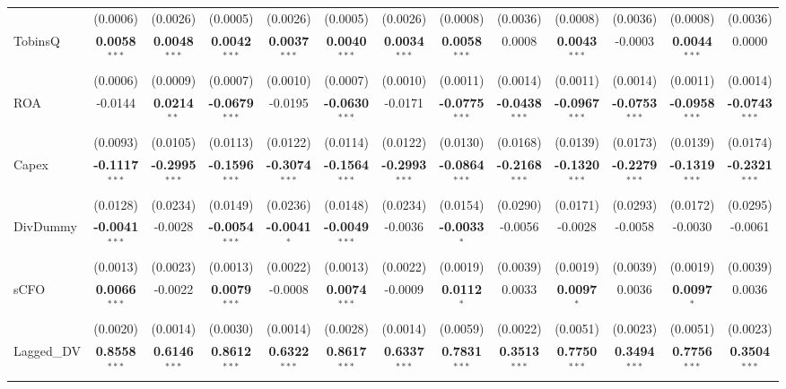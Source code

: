 \begin{landscape}
\begin{table}[H]
\begin{tabular}{lcccccccccccc}
 & (0.0006) & (0.0026) & (0.0005) & (0.0026) & (0.0005) & (0.0026) & (0.0008) & (0.0036) & (0.0008) & (0.0036) & (0.0008) & (0.0036) \\
TobinsQ & \textbf{0.0058}$^{***}$ & \textbf{0.0048}$^{***}$ & \textbf{0.0042}$^{***}$ & \textbf{0.0037}$^{***}$ & \textbf{0.0040}$^{***}$ & \textbf{0.0034}$^{***}$ & \textbf{0.0058}$^{***}$ & 0.0008 & \textbf{0.0043}$^{***}$ & -0.0003 & \textbf{0.0044}$^{***}$ & 0.0000 \\
 & (0.0006) & (0.0009) & (0.0007) & (0.0010) & (0.0007) & (0.0010) & (0.0011) & (0.0014) & (0.0011) & (0.0014) & (0.0011) & (0.0014) \\
ROA & -0.0144 & \textbf{0.0214}$^{**}$ & \textbf{-0.0679}$^{***}$ & -0.0195 & \textbf{-0.0630}$^{***}$ & -0.0171 & \textbf{-0.0775}$^{***}$ & \textbf{-0.0438}$^{***}$ & \textbf{-0.0967}$^{***}$ & \textbf{-0.0753}$^{***}$ & \textbf{-0.0958}$^{***}$ & \textbf{-0.0743}$^{***}$ \\
 & (0.0093) & (0.0105) & (0.0113) & (0.0122) & (0.0114) & (0.0122) & (0.0130) & (0.0168) & (0.0139) & (0.0173) & (0.0139) & (0.0174) \\
Capex & \textbf{-0.1117}$^{***}$ & \textbf{-0.2995}$^{***}$ & \textbf{-0.1596}$^{***}$ & \textbf{-0.3074}$^{***}$ & \textbf{-0.1564}$^{***}$ & \textbf{-0.2993}$^{***}$ & \textbf{-0.0864}$^{***}$ & \textbf{-0.2168}$^{***}$ & \textbf{-0.1320}$^{***}$ & \textbf{-0.2279}$^{***}$ & \textbf{-0.1319}$^{***}$ & \textbf{-0.2321}$^{***}$ \\
 & (0.0128) & (0.0234) & (0.0149) & (0.0236) & (0.0148) & (0.0234) & (0.0154) & (0.0290) & (0.0171) & (0.0293) & (0.0172) & (0.0295) \\
DivDummy & \textbf{-0.0041}$^{***}$ & -0.0028 & \textbf{-0.0054}$^{***}$ & \textbf{-0.0041}$^{*}$ & \textbf{-0.0049}$^{***}$ & -0.0036 & \textbf{-0.0033}$^{*}$ & -0.0056 & -0.0028 & -0.0058 & -0.0030 & -0.0061 \\
 & (0.0013) & (0.0023) & (0.0013) & (0.0022) & (0.0013) & (0.0022) & (0.0019) & (0.0039) & (0.0019) & (0.0039) & (0.0019) & (0.0039) \\
sCFO & \textbf{0.0066}$^{***}$ & -0.0022 & \textbf{0.0079}$^{***}$ & -0.0008 & \textbf{0.0074}$^{***}$ & -0.0009 & \textbf{0.0112}$^{*}$ & 0.0033 & \textbf{0.0097}$^{*}$ & 0.0036 & \textbf{0.0097}$^{*}$ & 0.0036 \\
 & (0.0020) & (0.0014) & (0.0030) & (0.0014) & (0.0028) & (0.0014) & (0.0059) & (0.0022) & (0.0051) & (0.0023) & (0.0051) & (0.0023) \\
Lagged\_DV & \textbf{0.8558}$^{***}$ & \textbf{0.6146}$^{***}$ & \textbf{0.8612}$^{***}$ & \textbf{0.6322}$^{***}$ & \textbf{0.8617}$^{***}$ & \textbf{0.6337}$^{***}$ & \textbf{0.7831}$^{***}$ & \textbf{0.3513}$^{***}$ & \textbf{0.7750}$^{***}$ & \textbf{0.3494}$^{***}$ & \textbf{0.7756}$^{***}$ & \textbf{0.3504}$^{***}$ \\

\end{tabular}
\end{table}
\end{landscape}
